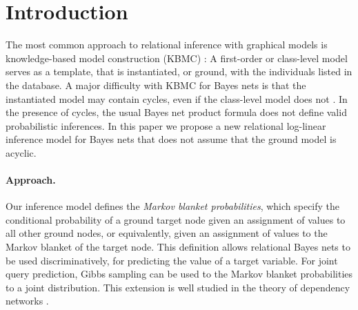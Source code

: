\documentclass[twoside,leqno,twocolumn]{article}
\begin{document}
\section{Introduction}
\addtolength{\textfloatsep}{-1.5mm}
The most common approach to relational inference with graphical models is knowledge-based model construction (KBMC) \cite{Ngo1997}: 
A first-order or class-level model serves as a template, that is instantiated, or ground, with the individuals listed in the database. 
 A major difficulty with KBMC
for Bayes nets \cite{Pearl1988}
is that the instantiated model may contain cycles, even if the class-level model does not \cite{Domingos2007,Taskar2002,Getoor2007c}. In the presence of cycles, the usual Bayes net product formula does not define valid probabilistic inferences. In this paper we propose a new relational log-linear inference model for Bayes nets that does not assume that the ground model is acyclic. 

\paragraph{Approach.} Our inference model defines the {\em Markov blanket probabilities}, which specify the conditional probability of a ground target node given an assignment of values to all other ground nodes, or equivalently, given an assignment of values to the Markov blanket of the target node. This definition allows relational Bayes nets to be used discriminatively, for predicting the value of a target variable. For joint query prediction, Gibbs sampling can be used to the Markov blanket probabilities to a joint distribution. This extension is well studied in the theory of dependency networks \cite{Heckerman2000,bib:jensen-chapter,Natarajan2012,Lowd2012}.
\end{document}
